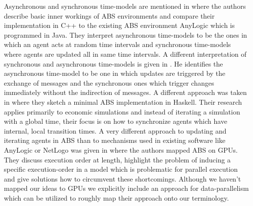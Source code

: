 Asynchronous and synchronous time-models are mentioned in \cite{dawson_opening_2014} where the authors describe basic inner workings of ABS environments and compare their implementation in C++ to the existing ABS environment AnyLogic which is programmed in Java. They interpret asynchronous time-models to be the ones in which an agent acts at random time intervals and synchronous time-models where agents are updated all in same time intervals.
A different interpretation of synchronous and asynchronous time-models is given in \cite{yuxuan_agent-based_2016}. He identifies the asynchronous time-model to be one in which updates are triggered by the exchange of messages and the synchronous ones which trigger changes immediately without the indirection of messages.
A different approach was taken in \cite{botta_time_2010} where they sketch a minimal ABS implementation in Haskell. Their research applies primarily to economic simulations and instead of iterating a simulation with a global time, their focus is on how to synchronize agents which have internal, local transition times. 
A very different approach to updating and iterating agents in ABS than to mechanisms used in existing software like AnyLogic or NetLogo was given in \cite{lysenko_framework_2008} where the authors mapped ABS on GPUs. They discuss execution order at length, highlight the problem of inducing a specific execution-order in a model which is problematic for parallel execution and give solutions how to circumvent these shortcomings. Although we haven't mapped our ideas to GPUs we explicitly include an approach for data-parallelism which can be utilized to roughly map their approach onto our terminology. 
